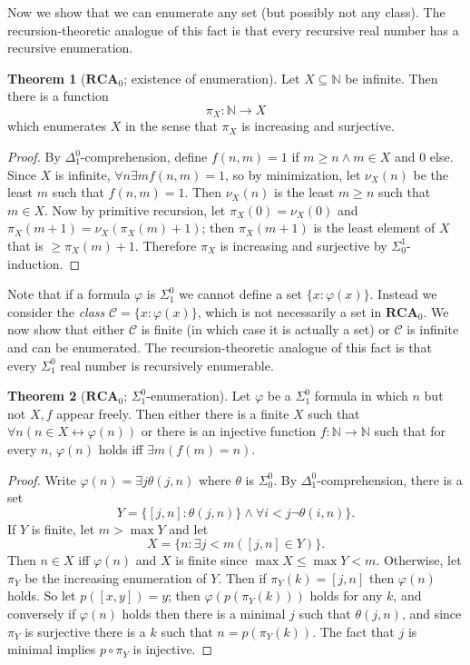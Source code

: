 \documentclass[12pt]{book}
\newcommand{\NN}{\mathbb{N}}
\newcommand{\RCA}{\mathbf{RCA}}
\theoremstyle{definition}
\newtheorem{theorem}{Theorem}[chapter]
\begin{document}
Now we show that we can enumerate any set (but possibly not any class).
The recursion-theoretic analogue of this fact is that every recursive real number has a recursive enumeration.

\begin{theorem}[$\RCA_0$; existence of enumeration]
Let $X \subseteq \NN$ be infinite. Then there is a function
$$\pi_X: \NN \to X$$
which enumerates $X$ in the sense that $\pi_X$ is increasing and surjective.
\end{theorem}
\begin{proof}
By $\Delta_1^0$-comprehension, define $f(n, m) = 1$ if $m \geq n \wedge m \in X$ and $0$ else.
Since $X$ is infinite, $\forall n \exists m f(n, m) = 1$, so by minimization, let $\nu_X(n)$ be the least $m$ such that $f(n, m) = 1$.
Then $\nu_X(n)$ is the least $m \geq n$ such that $m \in X$.
Now by primitive recursion, let $\pi_X(0) = \nu_X(0)$ and $\pi_X(m+1) = \nu_X(\pi_X(m) + 1)$; then $\pi_X(m+1)$ is the least element of $X$ that is $\geq \pi_X(m) + 1$.
Therefore $\pi_X$ is increasing and surjective by $\Sigma_0^1$-induction.
\end{proof}

Note that if a formula $\varphi$ is $\Sigma_1^0$ we cannot define a set $\{x: \varphi(x)\}$.
Instead we consider the \emph{class} $\mathcal C =\{x: \varphi(x)\}$, which is not necessarily a set in $\RCA_0$.
We now show that either $\mathcal C$ is finite (in which case it is actually a set) or $\mathcal C$ is infinite and can be enumerated.
The recursion-theoretic analogue of this fact is that every $\Sigma_1^0$ real number is recursively enumerable.

\begin{theorem}[$\RCA_0$; $\Sigma_1^0$-enumeration]
Let $\varphi$ be a $\Sigma_1^0$ formula in which $n$ but not $X,f$ appear freely.
Then either there is a finite $X$ such that $\forall n(n \in X \leftrightarrow \varphi(n))$ or there is an injective function $f: \NN \to \NN$ such that for every $n$, $\varphi(n)$ holds iff $\exists m(f(m) = n)$.
\end{theorem}
\begin{proof}
Write $\varphi(n) = \exists j \theta(j, n)$ where $\theta$ is $\Sigma_0^0$.
By $\Delta_1^0$-comprehension, there is a set
$$Y = \{[j, n]: \theta(j, n)\} \wedge \forall i < j\neg\theta(i, n)\}.$$
If $Y$ is finite, let $m > \max Y$ and let
$$X = \{n: \exists j < m([j, n] \in Y)\}.$$
Then $n \in X$ iff $\varphi(n)$ and $X$ is finite since $\max X \leq \max Y < m$.
Otherwise, let $\pi_Y$ be the increasing enumeration of $Y$.
Then if $\pi_Y(k) = [j, n]$ then $\varphi(n)$ holds.
So let $p([x, y]) = y$; then $\varphi(p(\pi_Y(k)))$ holds for any $k$, and conversely if $\varphi(n)$ holds then there is a minimal $j$ such that $\theta(j, n)$, and since $\pi_Y$ is surjective there is a $k$ such that $n = p(\pi_Y(k))$.
The fact that $j$ is minimal implies $p \circ \pi_Y$ is injective.
\end{proof}
\end{document}
